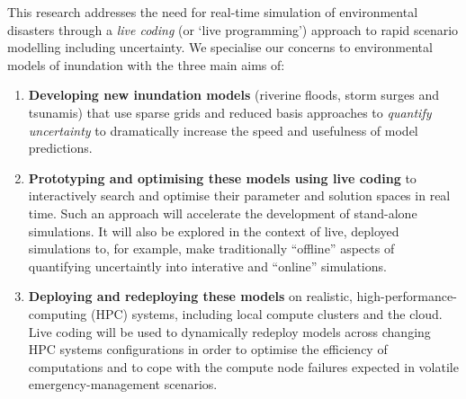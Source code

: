 This research addresses the need for real-time simulation of
environmental disasters through a {\em live coding} (or ‘live programming’)
approach to {rapid scenario modelling including uncertainty}. We specialise our concerns to
environmental models of inundation with the three main aims of:
\begin{enumerate}

\item {\bf Developing new inundation models} (riverine floods,
  storm surges and tsunamis) that use sparse grids and reduced basis
  approaches to {\em quantify uncertainty} to dramatically increase the
  speed and usefulness of model predictions. 

\item {\bf Prototyping and optimising these models using live coding}
  to interactively search and optimise their parameter and solution spaces in real time. 
  Such an approach will accelerate the development of stand-alone simulations. It will also be explored in the 
  context of  live, deployed simulations to, for example, make traditionally ``offline'' aspects of 
   quantifying uncertaintly into  interative and ``online'' simulations.
  

\item {\bf Deploying and redeploying these models} on realistic,
  high-performance-computing (HPC) systems,
  including local compute clusters and the cloud. Live coding will be used
  to dynamically redeploy models across changing HPC systems configurations in order to optimise the efficiency of computations and 
  to cope with the compute node failures expected in volatile emergency-management scenarios.

\end{enumerate}

